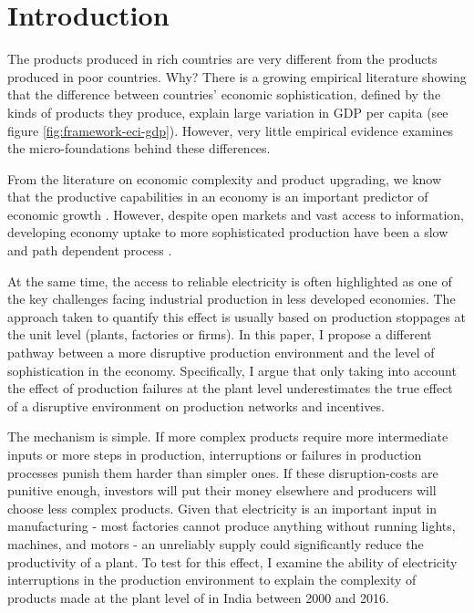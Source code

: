 \documentclass[11pt]{article}
\begin{document}



% 



\newpage


\section{Introduction}\label{sec:introduction}

The products produced in rich countries are very different from the products produced in poor countries. Why? There is a growing empirical literature showing that the difference between countries' economic sophistication, defined by the kinds of products they produce, explain large variation in GDP per capita (see figure \ref{fig:framework-eci-gdp}). However, very little empirical evidence examines the micro-foundations behind these differences.

From the literature on economic complexity and product upgrading, we know that the productive capabilities in an economy is an important predictor of economic growth \citep{hausmann_network_2011}. However, despite open markets and vast access to information, developing economy uptake to more sophisticated production have been a slow and path dependent process \citep{hidalgo_product_2007}.

At the same time, the access to reliable electricity is often highlighted as one of the key challenges facing industrial production in less developed economies. The approach taken to quantify this effect is usually based on production stoppages at the unit level (plants, factories or firms). In this paper, I propose a different pathway between a more disruptive production environment and the level of sophistication in the economy. Specifically, I argue that only taking into account the effect of production failures at the plant level underestimates the true effect of a disruptive environment on production networks and incentives.

The mechanism is simple. If more complex products require more intermediate inputs or more steps in production, interruptions or failures in production processes punish them harder than simpler ones. If these disruption-costs are punitive enough, investors will put their money elsewhere and producers will choose less complex products. Given that electricity is an important input in manufacturing -  most factories cannot produce anything without running lights, machines, and motors - an unreliably supply could significantly reduce the productivity of a plant. To test for this effect, I examine the ability of electricity interruptions in the production environment to explain the complexity of products made at the plant level of in India between 2000 and 2016. 
\end{document}
